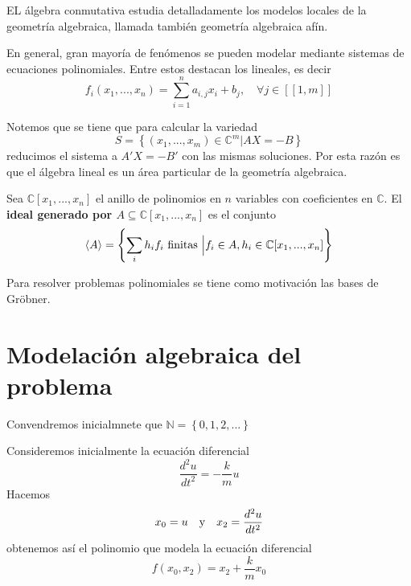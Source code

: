 \documentclass[12pt]{report}
\theoremstyle{largebreak}
\newcommand\natint[1]{\ensuremath{\left[\!\left[ #1\right]\!\right]}}
\begin{document}
    EL álgebra conmutativa estudia detalladamente los modelos locales de la geometría algebraica, llamada también geometría algebraica afín.
    
    En general, gran mayoría de fenómenos se pueden modelar mediante sistemas de ecuaciones polinomiales. Entre estos destacan los lineales, es decir
    \begin{equation*}
        f_i(x_1,...,x_n)=\sum_{ i=1}^n a_{i,j}x_i+b_j,\quad\forall j\in\natint{1,m}
    \end{equation*}

    Notemos que se tiene que para calcular la variedad
    \begin{equation*}
        S=\left\{(x_1,...,x_m)\in\mathbb{C}^m\Big|AX=-B \right\}
    \end{equation*}
    reducimos el sistema a $A'X=-B'$ con las mismas soluciones. Por esta razón es que el álgebra lineal es un área particular de la geometría algebraica.

    \begin{mydef}
        Sea $\mathbb{C}[x_1,...,x_n]$ el anillo de polinomios en $n$ variables con coeficientes en $\mathbb{C}$. El \textbf{ideal generado por $A\subseteq\mathbb{C}[x_1,...,x_n]$} es el conjunto
        \begin{equation*}
            \langle A\rangle=\left\{\sum_{ i}h_if_i\textup{ finitas }\Big|f_i\in A, h_i\in\mathbb{C}[x_1,...,x_n]\right\}
        \end{equation*}
    \end{mydef}

    Para resolver problemas polinomiales se tiene como motivación las bases de Gröbner.

    \section{Modelación algebraica del problema}

    \begin{obs}
        Convendremos inicialmnete que $\mathbb{N}=\left\{0,1,2,...\right\}$
    \end{obs}

    Consideremos inicialmente la ecuación diferencial
    \begin{equation*}
        \frac{d^2u}{dt^2}=-\frac{k}{m}u
    \end{equation*}
    Hacemos
    \begin{equation*}
        x_0=u\quad\textup{y}\quad x_2=\frac{d^2u}{dt^2}
    \end{equation*}
    obtenemos así el polinomio que modela la ecuación diferencial
    \begin{equation*}
        f(x_0,x_2)=x_2+\frac{k}{m}x_0
    \end{equation*}
\end{document}
